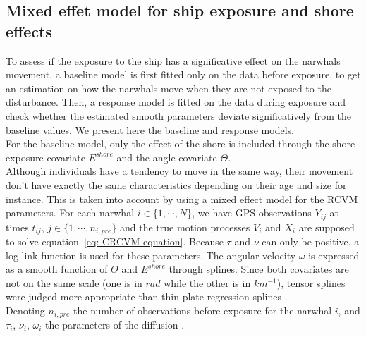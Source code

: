 \documentclass[11pt]{article}
\newcommand {\1}{\mathbb{1}}
\begin{document}
\subsection{Mixed effet model for ship exposure and shore effects}
\label{subsection: ship exposure effect}


To assess if the exposure to the ship has a significative effect on the narwhals movement, a baseline model is first fitted only on the data before exposure, to get an estimation on how the narwhals move when they are not exposed to the disturbance. Then, a response model is fitted on the data during exposure and check whether the estimated smooth parameters deviate significatively from the baseline values. We present here the baseline and response models.\\

For the baseline model, only the effect of the shore is included through the shore exposure covariate $E^{shore}$ and the angle covariate $\Theta$.\\
Although individuals have a tendency to move in the same way, their movement don't have exactly the same characteristics depending on their age and size for instance. This is taken into account by using a mixed effect model for the RCVM parameters.
For each narwhal $i \in \{1, \cdots, N\}$, we have 	GPS observations $Y_{ij}$ at times $t_{ij}$, $j \in \{1,\cdots,n_{i,pre}\}$ and the true motion processes $V_i$ and $X_i$ are supposed to solve equation~\ref{eq: CRCVM equation}. Because $\tau$ and $\nu$ can only be positive, a log link function is used for these parameters. The angular velocity $\omega$ is expressed as a smooth function of $\Theta$ and $E^{shore}$ through splines. Since both covariates are not on the same scale (one is in $rad$ while the other is in $km^{-1}$), tensor splines were judged more appropriate than thin plate regression splines \cite{wood_generalized_2017}.\\

Denoting $n_{i,pre}$ the number of observations before exposure for the narwhal $i$, and $\tau_i$, $\nu_i$, $\omega_i$ the parameters of the diffusion .
\end{document}
